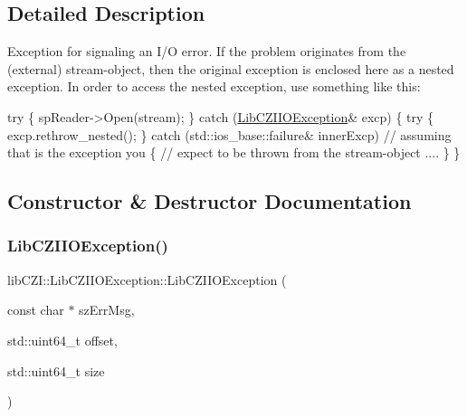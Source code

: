 \subsection{Detailed Description}
Exception for signaling an I/O error. If the problem originates from the (external) stream-\/object, then the original exception is enclosed here as a nested exception. In order to access the nested exception, use something like this\+: 
\begin{DoxyCode}
\textcolor{keywordflow}{try}
    \{
        spReader->Open(stream);
    \}
    \textcolor{keywordflow}{catch} (\hyperlink{classlib_c_z_i_1_1_lib_c_z_i_i_o_exception_aa8912797c22c48afee6e24bdb1e03008}{LibCZIIOException}& excp)
    \{
        \textcolor{keywordflow}{try}
        \{
            excp.rethrow\_nested();
        \}
        \textcolor{keywordflow}{catch} (std::ios\_base::failure& innerExcp) \textcolor{comment}{// assuming that is the exception you }
        \{                                         \textcolor{comment}{// expect to be thrown from the stream-object}
         ....
        \}
    \}
\end{DoxyCode}
 

\subsection{Constructor \& Destructor Documentation}
\mbox{\label{classlib_c_z_i_1_1_lib_c_z_i_i_o_exception_aa8912797c22c48afee6e24bdb1e03008}} 
\subsubsection{\texorpdfstring{Lib\+C\+Z\+I\+I\+O\+Exception()}{LibCZIIOException()}}
{\footnotesize\ttfamily lib\+C\+Z\+I\+::\+Lib\+C\+Z\+I\+I\+O\+Exception\+::\+Lib\+C\+Z\+I\+I\+O\+Exception (\begin{DoxyParamCaption}\item[{const char $\ast$}]{sz\+Err\+Msg,  }\item[{std\+::uint64\+\_\+t}]{offset,  }\item[{std\+::uint64\+\_\+t}]{size }\end{DoxyParamCaption})\hspace{0.3cm}{\ttfamily [inline]}}


